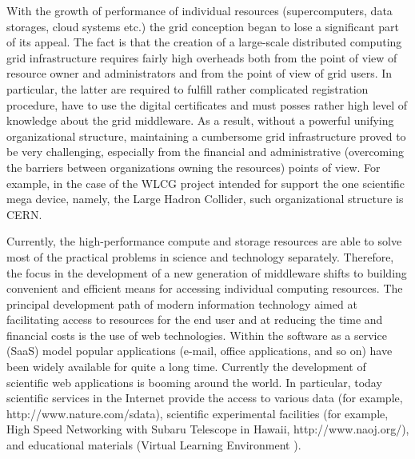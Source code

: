 \documentclass[procedia]{easychair}
\begin{document}
With the growth of performance of individual resources (supercomputers, data storages, cloud systems \cite{4} etc.) the grid conception began to lose a significant part of its appeal. The fact is that the creation of a large-scale distributed computing grid infrastructure requires fairly high overheads both from the point of view of resource owner and administrators and from the point of view of grid users. In particular, the latter are required to fulfill rather complicated registration procedure, have to use the digital certificates and must posses rather high level of knowledge about the grid middleware. As a result, without a powerful unifying organizational structure, maintaining a cumbersome grid infrastructure proved to be very challenging, especially from the financial and administrative (overcoming the barriers between organizations owning the resources) points of view. For example, in the case of the WLCG project intended for support the one scientific mega device, namely, the Large Hadron Collider, such organizational structure is CERN. 

Currently, the high-performance compute and storage resources are able to solve most of the practical problems in science and technology separately. Therefore, the focus in the development of a new generation of middleware shifts to building convenient and efficient means for accessing individual computing resources. The principal development path of modern information technology aimed at facilitating access to resources for the end user and at reducing the time and financial costs is the use of web technologies. Within the software as a service (SaaS) model popular applications (e-mail, office applications, and so on) have been widely available for quite a long time. Currently the development of scientific web applications is booming around the world. In particular, today scientific services in the Internet provide the access to various data (for example, http://www.nature.com/sdata), scientific experimental facilities (for example, High Speed Networking with Subaru Telescope in Hawaii, http://www.naoj.org/), and educational materials (Virtual Learning Environment \cite{5}). 
\end{document}
